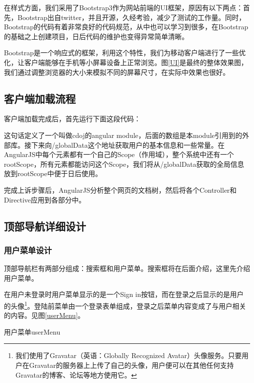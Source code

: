 在样式方面，我们采用了Bootstrap3作为网站前端的UI框架，原因有以下两点：首先，Bootstrap出自twitter，并且开源，久经考验，减少了测试的工作量。同时，Bootstrap的代码有着非常良好的代码规范，从中也可以学习到很多，在Bootstrap的基础之上创建项目，日后代码的维护也变得异常简单清晰。

Bootstrap是一个响应式的框架，利用这个特性，我们为移动客户端进行了一些优化，让客户端能够在手机等小屏幕设备上正常浏览。图\ref{UI}是最终的整体效果图，我们通过调整浏览器的大小来模拟不同的屏幕尺寸，在实际中效果也很好。

\subsection{客户端加载流程}
客户端加载完成后，首先运行下面这段代码：



这句话定义了一个叫做cdoj的angular module，后面的数组是本module引用到的外部库。接下来向/globalData这个地址获取用户的基本信息和一些常量。在AngularJS中每个元素都有一个自己的Scope（作用域），整个系统中还有一个rootScope，所有元素都能访问这个Scope，我们将从/globalData获取的全局信息放到rootScope中便于日后使用。



完成上诉步骤后，AngularJS分析整个网页的文档树，然后将各个Controller和Directive应用到各部分中。

\subsection{顶部导航详细设计}
\subsubsection{用户菜单设计}
顶部导航栏有两部分组成：搜索框和用户菜单。搜索框将在后面介绍，这里先介绍用户菜单。

在用户未登录时用户菜单显示的是一个Sign in按钮，而在登录之后显示的是用户的头像\footnote{我们使用了Gravatar（英语：Globally Recognized Avatar）头像服务。只要用户在Gravatar的服务器上上传了自己的头像，用户便可以在其他任何支持Gravatar的博客、论坛等地方使用它。}。登陆前菜单由一个登录表单组成，登录之后菜单内容变成了与用户相关的内容。见图\ref{userMenu}。

\begin{pics}[htbp]{用户菜单}{userMenu}
\end{pics}

